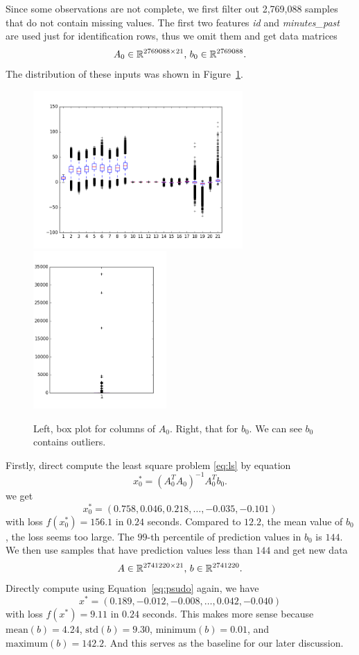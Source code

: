 Since some observations are not complete,
we first filter out 2,769,088 samples that do not contain missing values.
The first two features \emph{id} and \emph{minutes\_past}
are used just for identification rows,
thus we omit them and
get data matrices
\begin{equation}
    A_0 \in {\mathbb{R}}^{2769088\times 21}, \,
    b_0\in{\mathbb{R}}^{2769088}.
\end{equation}
The distribution of these inputs was shown in Figure~\ref{fig:box}.
\begin{figure}[htb]
	\centering
	\includegraphics[height=6cm]{fig/box_a_0.png}
	\includegraphics[height=6cm]{fig/box_b_0.png}
	\caption{\small
		Left, box plot for columns of $A_0$.
        Right, that for $b_0$.
        We can see $b_0$ contains outliers.}
	\label{fig:box}
\end{figure}

Firstly, direct compute the least square problem \eqref{eq:ls}
by equation
\begin{equation} \label{eq:psudo}
    x_0^*=(A_0^TA_0)^{-1}A_0^Tb_0.
\end{equation}
we get
$$
    x_0^*=(0.758, 0.046, 0.218, \dots, -0.035, -0.101)
$$
with loss $f(x_0^*) = 156.1$ in $0.24$ seconds.
Compared to $12.2$, the mean value of $b_0$,
the loss seems too large.
The $99$-th percentile of prediction values in $b_0$ is $144$.
We then use samples that have prediction values less than $144$
and get new data
\begin{equation}
    A \in {\mathbb{R}}^{2741220\times 21}, \,
    b\in{\mathbb{R}}^{2741220}.
\end{equation}
Directly compute using Equation~\eqref{eq:psudo} again, we have
$$
    x^*=(0.189, -0.012, -0.008, \dots, 0.042, -0.040)
$$
with loss $f(x^*) = 9.11$ in $0.24$ seconds.
This makes more sense because
$\text{mean}(b)=4.24$,
$\text{std}(b) = 9.30$,
$\text{minimum}(b) = 0.01$, and
$\text{maximum}(b) = 142.2$.
And this serves as the baseline for our later discussion.
